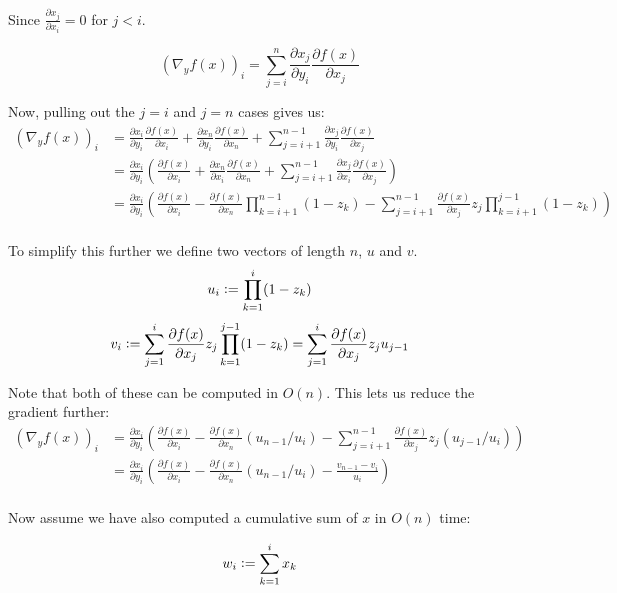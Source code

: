 \documentclass{article}
\newcommand{\defeq}{\vcentcolon=}
\begin{document}
Since $\frac{\partial x_j}{\partial x_i} = 0$ for $j < i$.

$$\left( \nabla_y f(x) \right)_i = \sum_{j=i}^{n} \frac{\partial x_j}{\partial
y_i} \frac{\partial f(x)}{\partial x_j}$$

Now, pulling out the $j=i$ and $j=n$ cases gives us:
\begin{align*}
\left( \nabla_y f(x) \right)_i &=
\frac{\partial x_i}{\partial y_i} \frac{\partial f(x)}{\partial x_i} +
\frac{\partial x_n}{\partial y_i} \frac{\partial f(x)}{\partial x_n} +
\sum_{j=i+1}^{n-1} \frac{\partial x_j}{\partial
y_i} \frac{\partial f(x)}{\partial x_j} \\
&=
\frac{\partial x_i}{\partial y_i} \left(
\frac{\partial f(x)}{\partial x_i} +
\frac{\partial x_n}{\partial x_i} \frac{\partial f(x)}{\partial x_n} +
\sum_{j=i+1}^{n-1} \frac{\partial x_j}{\partial
x_i} \frac{\partial f(x)}{\partial x_j} \right) \\
&=
\frac{\partial x_i}{\partial y_i} \left(
\frac{\partial f(x)}{\partial x_i} -
\frac{\partial f(x)}{\partial x_n} \prod_{k=i+1}^{n-1} (1 - z_k)
- \sum_{j=i+1}^{n-1} \frac{\partial f(x)}{\partial x_j}
z_j \prod_{k=i+1}^{j-1} (1 - z_k) \right) \\
\end{align*}

To simplify this further we define two vectors of length $n$, $u$ and $v$.
$$u_i \defeq \prod_{k=1}^{i} (1 - z_k)$$
$$v_i \defeq
\sum_{j=1}^{i} \frac{\partial f(x)}{\partial x_j} z_j \prod_{k=1}^{j-1} (1 - z_k)
= \sum_{j=1}^{i} \frac{\partial f(x)}{\partial x_j} z_j u_{j-1}
$$

Note that both of these can be computed in $O(n)$. This lets us reduce the
gradient further:
\begin{align*}
\left( \nabla_y f(x) \right)_i
&=
\frac{\partial x_i}{\partial y_i} \left(
\frac{\partial f(x)}{\partial x_i}
- \frac{\partial f(x)}{\partial x_n} (u_{n-1} / u_i)
- \sum_{j=i+1}^{n-1} \frac{\partial f(x)}{\partial x_j}
z_j (u_{j-1} / u_{i}) \right) \\
&=
\frac{\partial x_i}{\partial y_i} \left(
\frac{\partial f(x)}{\partial x_i}
- \frac{\partial f(x)}{\partial x_n} (u_{n-1} / u_i)
- \frac{v_{n-1} - v_i}{u_i} \right) \\
\end{align*}

Now assume we have also computed a cumulative sum of $x$ in $O(n)$ time:

$$w_i \defeq \sum_{k=1}^i x_k$$
\end{document}
